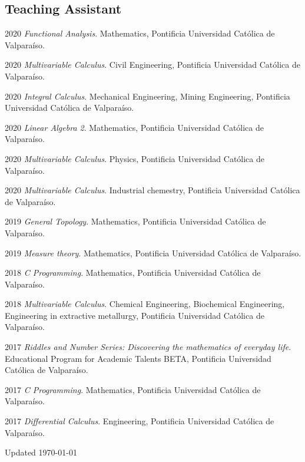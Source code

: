 \documentclass[12pt,letterpaper]{report}
\begin{document}
    \subsection*{Teaching Assistant}

    \begin{tablist}

        \item[2020] \tab \emph{Functional Analysis}. Mathematics, Pontificia Universidad Cat\'olica de Valpara\'iso. 
            
        \item[2020] \tab \emph{Multivariable Calculus}. Civil Engineering, Pontificia Universidad Cat\'olica de Valpara\'iso. 
            
        \item[2020] \tab \emph{Integral Calculus}. Mechanical Engineering, Mining Engineering, Pontificia Universidad Cat\'olica de Valpara\'iso. 
            
        \item[2020] \tab \emph{Linear Algebra 2}. Mathematics, Pontificia Universidad Cat\'olica de Valpara\'iso.
            
        \item[2020] \tab \emph{Multivariable Calculus}. Physics, Pontificia Universidad Cat\'olica de Valpara\'iso. 
            
        \item[2020] \tab \emph{Multivariable Calculus}. Industrial chemestry, Pontificia Universidad Cat\'olica de Valpara\'iso. 
        
        \item[2019] \tab \emph{General Topology}. Mathematics, Pontificia Universidad Cat\'olica de Valpara\'iso. 
            
        \item[2019] \tab \emph{Measure theory}. Mathematics, Pontificia Universidad Cat\'olica de Valpara\'iso. 
            
        \item[2018] \tab \emph{C Programming}. Mathematics, Pontificia Universidad Cat\'olica de Valpara\'iso. 
            
        \item[2018] \tab \emph{Multivariable Calculus}. Chemical Engineering, Biochemical Engineering, Engineering in extractive metallurgy, Pontificia Universidad Cat\'olica de Valpara\'iso. 
         
        \item[2017] \tab \emph{Riddles and Number Series: Discovering the mathematics of everyday life}. Educational Program for Academic Talents BETA, Pontificia Universidad Cat\'olica de Valpara\'iso.

        \item[2017] \tab \emph{C Programming}. Mathematics, Pontificia Universidad Cat\'olica de Valpara\'iso. 
            
        \item[2017] \tab \emph{Differential Calculus}. Engineering, Pontificia Universidad Cat\'olica de Valpara\'iso. 

    \end{tablist}
    \begin{center}
        \vfill
        Updated \monthyeardate\today
    \end{center}
\end{document}
